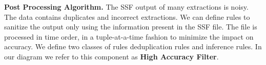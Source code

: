 \textbf{Post Processing Algorithm.}
\label{sec:postproc}
The SSF output of many extractions is noisy. The data contains duplicates and incorrect extractions. We can define rules to sanitize the output only using the information present in the SSF file. The file is processed in time order, in a tuple-at-a-time fashion to minimize the impact on accuracy. We define two classes of rules deduplication rules and inference rules. In our diagram we refer to this component as \textbf{High Accuracy Filter}.
